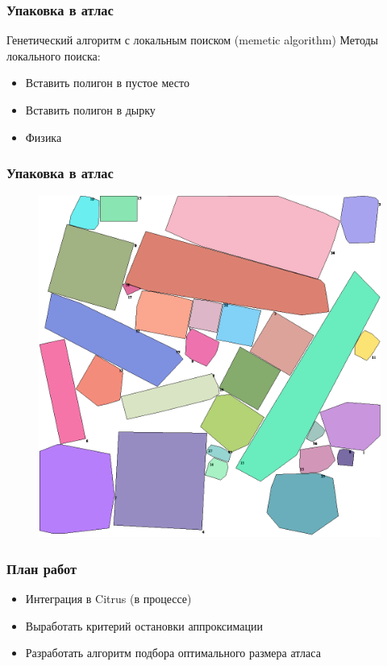 \documentclass[10pt, unicode]{beamer}
\begin{document}
    \begin{frame}
        \frametitle{Упаковка в атлас}
        Генетический алгоритм с локальным поиском (memetic algorithm)
        Методы локального поиска:
        \begin{itemize}
            \item Вставить полигон в пустое место
            \item Вставить полигон в дырку
            \item Физика
        \end{itemize}
    \end{frame}
    \begin{frame}
        \frametitle{Упаковка в атлас}
        \begin{figure}
            \centering
            \includegraphics[width=\linewidth, height=.9\textheight, keepaspectratio]{PackExample.png}
        \end{figure}
    \end{frame}
    \begin{frame}
        \frametitle{План работ}
        \begin{itemize}
            \item Интеграция в Citrus (в процессе)
            \item Выработать критерий остановки аппроксимации
            \item Разработать алгоритм подбора оптимального размера атласа
        \end{itemize}
    \end{frame}
\end{document}
